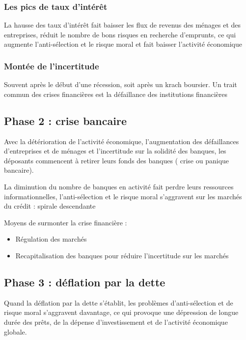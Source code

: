 	\subsubsection{Les pics de taux d'intérêt}
	
	La hausse des taux d'intérêt fait baisser les flux de revenus des 
ménages et des entreprises, réduit le nombre de bons risques en 
recherche d'emprunts, ce qui augmente l'anti-sélection et le risque 
moral et fait baisser l'activité économique

	\subsubsection{Montée de l'incertitude}
	Souvent après le début d'une récession, soit après un krach boursier. Un trait commun des crises financières est la défaillance des institutions financières
	

	\subsection{Phase 2 : crise bancaire}
	
	Avec la détérioration de l'activité économique, l'augmentation des défaillances d'entreprises et de ménages et l'incertitude sur la solidité des banques, les déposants commencent à retirer leurs fonds des banques ( crise ou panique bancaire).

	La diminution du nombre de banques en activité fait perdre leurs ressources informationnelles, l'anti-sélection et le risque moral s'aggravent sur les marchés du crédit : spirale descendante


	Moyens de surmonter la crise financière :
	\begin{itemize}
		\item Régulation des marchés
		\item Recapitalisation des banques pour réduire l'incertitude sur les marchés
	\end{itemize}

	\subsection{Phase 3 : déflation par la dette}
	
	Quand la déflation par la dette s'établit, les problèmes d'anti-sélection et de risque moral s'aggravent davantage, ce qui provoque une dépression de longue durée des prêts, de la dépense d'investissement et de l'activité économique globale. 


